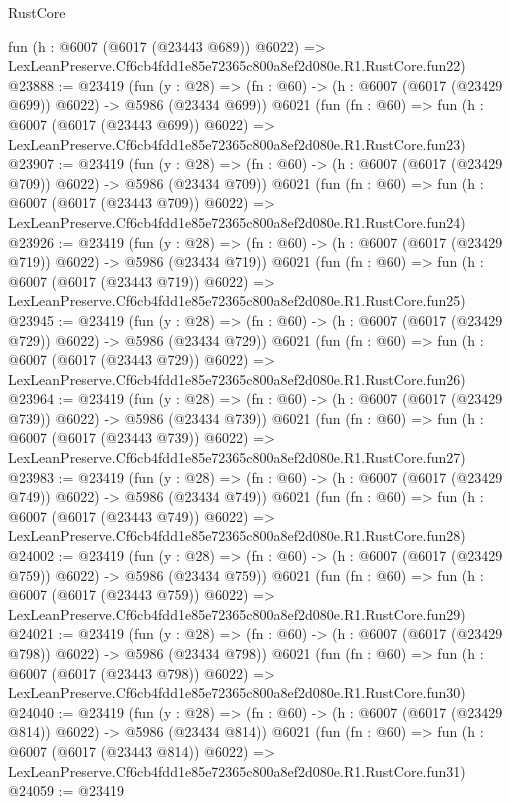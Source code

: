 \begin{lexlean}{RustCore}
\begin{coremodule}
    fun (h : @6007 (@6017 (@23443 @689)) @6022) =>
    LexLeanPreserve.Cf6cb4fdd1e85e72365c800a8ef2d080e.R1.RustCore.fun22)
@23888 := @23419
    (fun (y : @28) => (fn : @60) -> (h : @6007 (@6017 (@23429 @699)) @6022) -> @5986 (@23434 @699))
    @6021
    (fun (fn : @60) =>
    fun (h : @6007 (@6017 (@23443 @699)) @6022) =>
    LexLeanPreserve.Cf6cb4fdd1e85e72365c800a8ef2d080e.R1.RustCore.fun23)
@23907 := @23419
    (fun (y : @28) => (fn : @60) -> (h : @6007 (@6017 (@23429 @709)) @6022) -> @5986 (@23434 @709))
    @6021
    (fun (fn : @60) =>
    fun (h : @6007 (@6017 (@23443 @709)) @6022) =>
    LexLeanPreserve.Cf6cb4fdd1e85e72365c800a8ef2d080e.R1.RustCore.fun24)
@23926 := @23419
    (fun (y : @28) => (fn : @60) -> (h : @6007 (@6017 (@23429 @719)) @6022) -> @5986 (@23434 @719))
    @6021
    (fun (fn : @60) =>
    fun (h : @6007 (@6017 (@23443 @719)) @6022) =>
    LexLeanPreserve.Cf6cb4fdd1e85e72365c800a8ef2d080e.R1.RustCore.fun25)
@23945 := @23419
    (fun (y : @28) => (fn : @60) -> (h : @6007 (@6017 (@23429 @729)) @6022) -> @5986 (@23434 @729))
    @6021
    (fun (fn : @60) =>
    fun (h : @6007 (@6017 (@23443 @729)) @6022) =>
    LexLeanPreserve.Cf6cb4fdd1e85e72365c800a8ef2d080e.R1.RustCore.fun26)
@23964 := @23419
    (fun (y : @28) => (fn : @60) -> (h : @6007 (@6017 (@23429 @739)) @6022) -> @5986 (@23434 @739))
    @6021
    (fun (fn : @60) =>
    fun (h : @6007 (@6017 (@23443 @739)) @6022) =>
    LexLeanPreserve.Cf6cb4fdd1e85e72365c800a8ef2d080e.R1.RustCore.fun27)
@23983 := @23419
    (fun (y : @28) => (fn : @60) -> (h : @6007 (@6017 (@23429 @749)) @6022) -> @5986 (@23434 @749))
    @6021
    (fun (fn : @60) =>
    fun (h : @6007 (@6017 (@23443 @749)) @6022) =>
    LexLeanPreserve.Cf6cb4fdd1e85e72365c800a8ef2d080e.R1.RustCore.fun28)
@24002 := @23419
    (fun (y : @28) => (fn : @60) -> (h : @6007 (@6017 (@23429 @759)) @6022) -> @5986 (@23434 @759))
    @6021
    (fun (fn : @60) =>
    fun (h : @6007 (@6017 (@23443 @759)) @6022) =>
    LexLeanPreserve.Cf6cb4fdd1e85e72365c800a8ef2d080e.R1.RustCore.fun29)
@24021 := @23419
    (fun (y : @28) => (fn : @60) -> (h : @6007 (@6017 (@23429 @798)) @6022) -> @5986 (@23434 @798))
    @6021
    (fun (fn : @60) =>
    fun (h : @6007 (@6017 (@23443 @798)) @6022) =>
    LexLeanPreserve.Cf6cb4fdd1e85e72365c800a8ef2d080e.R1.RustCore.fun30)
@24040 := @23419
    (fun (y : @28) => (fn : @60) -> (h : @6007 (@6017 (@23429 @814)) @6022) -> @5986 (@23434 @814))
    @6021
    (fun (fn : @60) =>
    fun (h : @6007 (@6017 (@23443 @814)) @6022) =>
    LexLeanPreserve.Cf6cb4fdd1e85e72365c800a8ef2d080e.R1.RustCore.fun31)
@24059 := @23419

\end{coremodule}
\end{lexlean}
